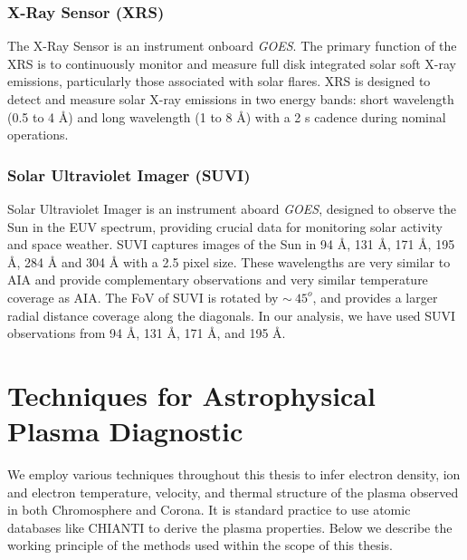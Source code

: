 \subsubsection{X-Ray Sensor (XRS)}

The X-Ray Sensor \citep[XRS;][]{xrs} is an instrument onboard {\it GOES}. The primary function of the XRS is to continuously monitor and measure full disk integrated solar soft X-ray emissions, particularly those associated with solar flares. XRS is designed to detect and measure solar X-ray emissions in two energy bands: short wavelength (0.5 to 4 {\AA}) and long wavelength (1 to 8 {\AA}) with a 2 s cadence during nominal operations.

\subsubsection{Solar Ultraviolet Imager (SUVI)}

Solar Ultraviolet Imager \citep[SUVI;][]{suvi} is an instrument aboard {\it GOES}, designed to observe the Sun in the EUV spectrum, providing crucial data for monitoring solar activity and space weather. SUVI captures images of the Sun in 94 {\AA}, 131 {\AA}, 171 {\AA}, 195 {\AA}, 284 {\AA} and 304 {\AA} with a 2.5{\arcsec} pixel size. These wavelengths are very similar to AIA and provide complementary observations and very similar temperature coverage as AIA. The FoV of SUVI is rotated by $\sim~45^{o}$, and provides a larger radial distance coverage along the diagonals. In our analysis, we have used SUVI observations from 94 {\AA}, 131 {\AA}, 171 {\AA}, and 195 {\AA}.

\section{Techniques for Astrophysical Plasma Diagnostic}

We employ various techniques throughout this thesis to infer electron density, ion and electron temperature, velocity, and thermal structure of the plasma observed in both Chromosphere and Corona. It is standard practice to use atomic databases like CHIANTI \citep{chianti,chianti1} to derive the plasma properties. Below we describe the working principle of the methods used within the scope of this thesis.

